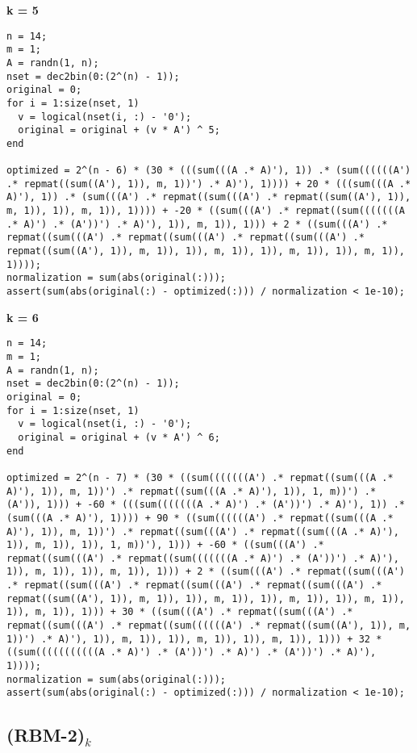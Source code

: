 {\bf k = 5}

\begin{lstlisting}
n = 14;
m = 1;
A = randn(1, n);
nset = dec2bin(0:(2^(n) - 1));
original = 0;
for i = 1:size(nset, 1)
  v = logical(nset(i, :) - '0');
  original = original + (v * A') ^ 5;
end

optimized = 2^(n - 6) * (30 * (((sum(((A .* A)'), 1)) .* (sum((((((A') .* repmat((sum((A'), 1)), m, 1))') .* A)'), 1)))) + 20 * (((sum(((A .* A)'), 1)) .* (sum(((A') .* repmat((sum(((A') .* repmat((sum((A'), 1)), m, 1)), 1)), m, 1)), 1)))) + -20 * ((sum(((A') .* repmat((sum(((((((A .* A)') .* (A'))') .* A)'), 1)), m, 1)), 1))) + 2 * ((sum(((A') .* repmat((sum(((A') .* repmat((sum(((A') .* repmat((sum(((A') .* repmat((sum((A'), 1)), m, 1)), 1)), m, 1)), 1)), m, 1)), 1)), m, 1)), 1))));
normalization = sum(abs(original(:)));
assert(sum(abs(original(:) - optimized(:))) / normalization < 1e-10);
\end{lstlisting}


{\bf k = 6}

\begin{lstlisting}
n = 14;
m = 1;
A = randn(1, n);
nset = dec2bin(0:(2^(n) - 1));
original = 0;
for i = 1:size(nset, 1)
  v = logical(nset(i, :) - '0');
  original = original + (v * A') ^ 6;
end

optimized = 2^(n - 7) * (30 * ((sum(((((((A') .* repmat((sum(((A .* A)'), 1)), m, 1))') .* repmat((sum(((A .* A)'), 1)), 1, m))') .* (A')), 1))) + -60 * (((sum(((((((A .* A)') .* (A'))') .* A)'), 1)) .* (sum(((A .* A)'), 1)))) + 90 * ((sum((((((A') .* repmat((sum(((A .* A)'), 1)), m, 1))') .* repmat((sum(((A') .* repmat((sum(((A .* A)'), 1)), m, 1)), 1)), 1, m))'), 1))) + -60 * ((sum(((A') .* repmat((sum(((A') .* repmat((sum(((((((A .* A)') .* (A'))') .* A)'), 1)), m, 1)), 1)), m, 1)), 1))) + 2 * ((sum(((A') .* repmat((sum(((A') .* repmat((sum(((A') .* repmat((sum(((A') .* repmat((sum(((A') .* repmat((sum((A'), 1)), m, 1)), 1)), m, 1)), 1)), m, 1)), 1)), m, 1)), 1)), m, 1)), 1))) + 30 * ((sum(((A') .* repmat((sum(((A') .* repmat((sum(((A') .* repmat((sum((((((A') .* repmat((sum((A'), 1)), m, 1))') .* A)'), 1)), m, 1)), 1)), m, 1)), 1)), m, 1)), 1))) + 32 * ((sum(((((((((((A .* A)') .* (A'))') .* A)') .* (A'))') .* A)'), 1))));
normalization = sum(abs(original(:)));
assert(sum(abs(original(:) - optimized(:))) / normalization < 1e-10);
\end{lstlisting}


\subsection{{\bf (RBM-2)$_k$}}



